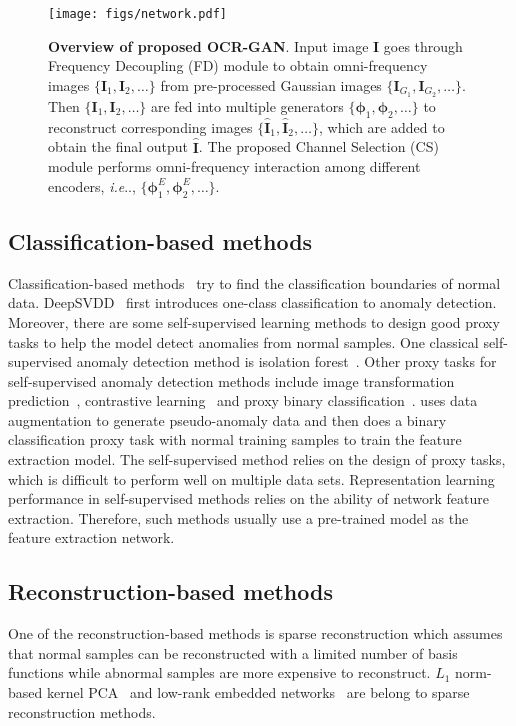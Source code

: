 \documentclass[lettersize,journal]{IEEEtran}
\makeatletter
\DeclareRobustCommand\onedot{\futurelet\@let@token\@onedot}
\def\@onedot{\ifx\@let@token.\else.\null\fi\xspace}
\def\ie{\emph{i.e}\onedot} \def\Ie{\emph{I.e}\onedot}
\makeatother
\begin{document}
\begin{figure*}[ht]
    \centering
    \texttt{[image: figs/network.pdf]}
    \caption{\textbf{Overview of proposed OCR-GAN}. Input image $\bm{I}$ goes through Frequency Decoupling (FD) module to obtain omni-frequency images $\{\bm{I}_1, \bm{I}_2, \dots\}$ from pre-processed Gaussian images $\{\bm{I}_{G_1}, \bm{I}_{G_2}, \dots\}$. Then $\{\bm{I}_1, \bm{I}_2, \dots\}$ are fed into multiple generators $\{\bm{\phi}_1, \bm{\phi}_2, \dots\}$ to reconstruct corresponding images $\{\hat{\bm{I}}_1, \hat{\bm{I}}_2, \dots\}$, which are added to obtain the final output $\hat{\bm{I}}$. The proposed Channel Selection (CS) module performs omni-frequency interaction among different encoders, \ie, $\{\bm{\phi}_1^E, \bm{\phi}_2^E, \dots\}$.}
    \label{fig:network}
\end{figure*}

\subsection{Classification-based methods}
Classification-based methods~\cite{ju2015image} try to find the classification boundaries of normal data. DeepSVDD~\cite{ruff2018deep} first introduces one-class classification to anomaly detection. 
Moreover, there are some self-supervised learning methods to design good proxy tasks to help the model detect anomalies from normal samples. One classical self-supervised anomaly detection method is isolation forest~\cite{liu2008isolation}. 
Other proxy tasks for self-supervised anomaly detection methods include image transformation prediction~\cite{golan2018deep,bergman2019classification }, contrastive learning~\cite{tack2020csi} and proxy binary classification~\cite{li2021cutpaste}. \cite{li2021cutpaste} uses data augmentation to generate pseudo-anomaly data and then does a binary classification proxy task with normal training samples to train the feature extraction model. The self-supervised method relies on the design of proxy tasks, which is difficult to perform well on multiple data sets. Representation learning performance in self-supervised methods relies on the ability of network feature extraction. Therefore, such methods usually use a pre-trained model as the feature extraction network.

\subsection{Reconstruction-based methods}
One of the reconstruction-based methods is sparse reconstruction which assumes that normal samples can be reconstructed with a limited number of basis functions while abnormal samples are more expensive to reconstruct. $L_1$ norm-based kernel PCA~\cite{xiao2013l1} and low-rank embedded networks~\cite{jiang2021lren} are belong to sparse reconstruction methods.
\end{document}

